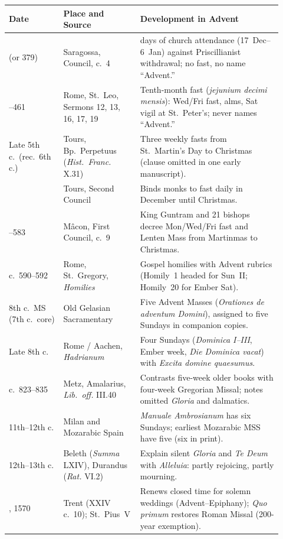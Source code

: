 \begin{longtable}{>{\raggedright\arraybackslash}p{0.18\linewidth}>{\raggedright\arraybackslash}p{0.26\linewidth}>{\raggedright\arraybackslash}p{0.48\linewidth}}
\toprule
\textbf{Date} & \textbf{Place and Source} & \textbf{Development in Advent} \\
\midrule
\endhead
380 (or 379) & Saragossa, Council, c.\ 4 & 21 days of church attendance (17~Dec--6~Jan) against Priscillianist withdrawal; no fast, no name ``Advent.'' \\
440--461 & Rome, St.~Leo, Sermons 12, 13, 16, 17, 19 & Tenth-month fast (\textit{jejunium decimi mensis}): Wed/Fri fast, alms, Sat vigil at St.~Peter's; never names ``Advent.'' \\
Late 5th c.\ (rec.\ 6th c.) & Tours, Bp.\ Perpetuus (\textit{Hist.\ Franc.} X.31) & Three weekly fasts from St.~Martin's Day to Christmas (clause omitted in one early manuscript). \\
567 & Tours, Second Council & Binds monks to fast daily in December until Christmas. \\
581--583 & M\^acon, First Council, c.\ 9 & King Guntram and 21 bishops decree Mon/Wed/Fri fast and Lenten Mass from Martinmas to Christmas. \\
c.\ 590--592 & Rome, St.~Gregory, \textit{Homilies} & Gospel homilies with Advent rubrics (Homily~1 headed for Sun~II; Homily~20 for Ember Sat). \\
8th c.\ MS (7th c.\ core) & Old Gelasian Sacramentary & Five Advent Masses (\textit{Orationes de adventum Domini}), assigned to five Sundays in companion copies. \\
Late 8th c. & Rome / Aachen, \textit{Hadrianum} & Four Sundays (\textit{Dominica I--III}, Ember week, \textit{Die Dominica vacat}) with \textit{Excita domine quaesumus}. \\
c.\ 823--835 & Metz, Amalarius, \textit{Lib.\ off.} III.40 & Contrasts five-week older books with four-week Gregorian Missal; notes omitted \textit{Gloria} and dalmatics. \\
11th--12th c. & Milan and Mozarabic Spain & \textit{Manuale Ambrosianum} has six Sundays; earliest Mozarabic MSS have five (six in print). \\
12th--13th c. & Beleth (\textit{Summa} LXIV), Durandus (\textit{Rat.} VI.2) & Explain silent \textit{Gloria} and \textit{Te Deum} with \textit{Alleluia}: partly rejoicing, partly mourning. \\
1563, 1570 & Trent (XXIV c.\ 10); St.~Pius~V & Renews closed time for solemn weddings (Advent--Epiphany); \textit{Quo primum} restores Roman Missal (200-year exemption). \\

\end{longtable}
